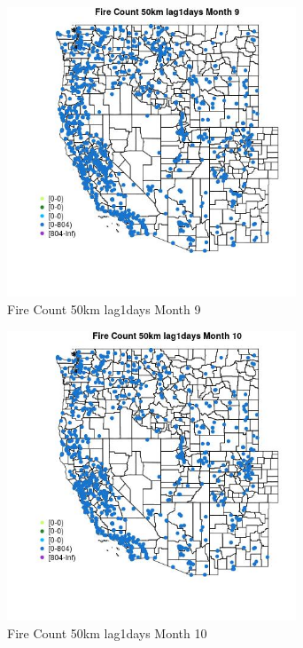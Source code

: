 \begin{figure} 
\centering  
\includegraphics[width=0.77\textwidth]{Code_Outputs/Report_ML_input_PM25_Step4_part_f_de_duplicated_aves_prioritize_24hr_obswNAs_MapObsMo9Fire_Count_50km_lag1days.jpg} 
\caption{\label{fig:Report_ML_input_PM25_Step4_part_f_de_duplicated_aves_prioritize_24hr_obswNAsMapObsMo9Fire_Count_50km_lag1days}Fire Count 50km lag1days Month 9} 
\end{figure} 
 

\begin{figure} 
\centering  
\includegraphics[width=0.77\textwidth]{Code_Outputs/Report_ML_input_PM25_Step4_part_f_de_duplicated_aves_prioritize_24hr_obswNAs_MapObsMo10Fire_Count_50km_lag1days.jpg} 
\caption{\label{fig:Report_ML_input_PM25_Step4_part_f_de_duplicated_aves_prioritize_24hr_obswNAsMapObsMo10Fire_Count_50km_lag1days}Fire Count 50km lag1days Month 10} 
\end{figure} 
 


